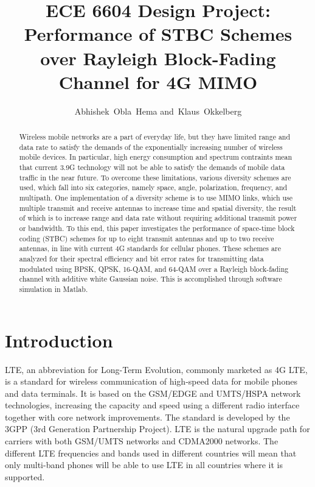 \documentclass[12pt,onecolumn]{IEEEtran}
\title{ECE 6604 Design Project:\\ Performance of STBC Schemes over Rayleigh Block-Fading Channel for 4G MIMO}
\author{Abhishek~Obla~Hema and~Klaus~Okkelberg}
\begin{document}
\maketitle

\begin{abstract}
  Wireless mobile networks are a part of everyday life, but they have limited range and data rate to satisfy the demands of the exponentially increasing number of wireless mobile devices. In particular, high energy consumption and spectrum contraints mean that current 3.9G technology will not be able to satisfy the demands of mobile data traffic in the near future. To overcome these limitations, various diversity schemes are used, which fall into six categories, namely space, angle, polarization, frequency, and multipath. One implementation of a diversity scheme is to use MIMO links, which use multiple transmit and receive antennas to increase time and spatial diversity, the result of which is to increase range and data rate without requiring additional transmit power or bandwidth. To this end, this paper investigates the performance of space-time block coding (STBC) schemes for up to eight transmit antennas and up to two receive antennas, in line with current 4G standards for cellular phones. These schemes are analyzed for their spectral efficiency and bit error rates for transmitting data modulated using BPSK, QPSK, 16-QAM, and 64-QAM over a Rayleigh block-fading channel with additive white Gaussian noise. This is accomplished through software simulation in Matlab.
\end{abstract}

\section{Introduction}

LTE, an abbreviation for Long-Term Evolution, commonly marketed as 4G LTE, is a standard for wireless communication of high-speed data for mobile phones and data terminals. It is based on the GSM/EDGE and UMTS/HSPA network technologies, increasing the capacity and speed using a different radio interface together with core network improvements. The standard is developed by the 3GPP (3rd Generation Partnership Project). LTE is the natural upgrade path for carriers with both GSM/UMTS networks and CDMA2000 networks. The different LTE frequencies and bands used in different countries will mean that only multi-band phones will be able to use LTE in all countries where it is supported.
\end{document}
